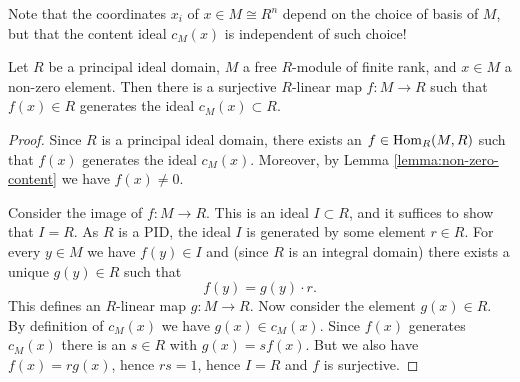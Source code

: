 Note that the coordinates $x_i$ of $x\in M \cong R^n$ depend on the choice of basis of $M$, but that the content ideal $c_M(x)$ is independent of such choice!

\begin{lemma}\label{lemma:content-division}
Let $R$ be a principal ideal domain, $M$ a free $R$-module of finite rank, and $x\in M$ a non-zero element.  Then
there is a surjective $R$-linear map $f\colon M\to R$ such that $f(x)\in R$ generates the ideal $c_M(x)\subset R$.
\end{lemma}

\begin{proof}
Since $R$ is a principal ideal domain, there exists an $f\in \operatorname{Hom}_R(M,R)$ such that $f(x)$ generates the ideal $c_M(x)$. Moreover, by Lemma \ref{lemma:non-zero-content} we have $f(x)\neq 0$.

Consider the image of $f\colon M\to R$. This is an ideal $I\subset R$, and it suffices to show that $I=R$. As $R$ is a PID, the ideal $I$ is generated by some element $r\in R$. For every $y \in M$ we have $f(y)\in I$ and (since $R$ is an integral domain) there exists a unique $g(y)\in R$ such that
\[
	f(y) = g(y) \cdot r.
\]
This defines an $R$-linear map $g\colon M\to R$. Now consider the element $g(x)\in R$. By definition of $c_M(x)$ we have $g(x)\in c_M(x)$. Since $f(x)$ generates $c_M(x)$ there is an $s\in R$ with $g(x)=sf(x)$. But we also have $f(x)=rg(x)$, hence $rs=1$, hence $I=R$ and $f$ is surjective.
\end{proof}


